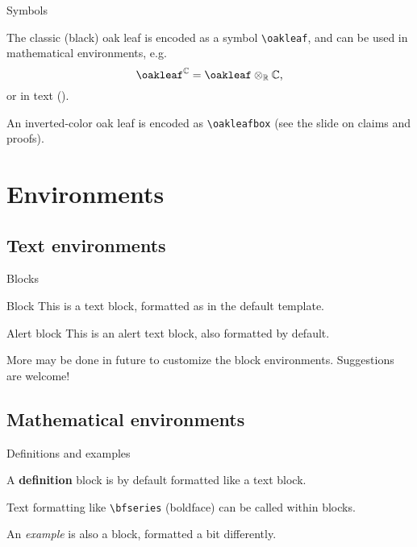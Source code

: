 \documentclass{beamer}
\begin{document}
\begin{frame}[fragile]{Symbols}

The classic (black) oak leaf is encoded as a symbol \verb|\oakleaf|, and can be used in mathematical environments, e.g.
\[\oakleaf^{\mathbb{C}}=\oakleaf\otimes_{\mathbb{R}}\mathbb{C}\text,\]
or in text (\oakleaf).

An inverted-color oak leaf is encoded as \verb|\oakleafbox| (see the slide on claims and proofs).

\end{frame}


\section{Environments}


\subsection{Text environments}


\begin{frame}{Blocks}

\begin{block}{Block}
This is a text block, formatted as in the default template.
\end{block}

\begin{alertblock}{Alert block}
This is an alert text block, also formatted by default.
\end{alertblock}

More may be done in future to customize the block environments. Suggestions are welcome!

\end{frame}


\subsection{Mathematical environments}


\begin{frame}[fragile]{Definitions and examples}

\begin{definition}
A {\bfseries definition} block is by default formatted like a text block.
\end{definition}

Text formatting like \verb|\bfseries| (boldface) can be called within blocks.

\begin{example}
An \emph{example} is also a block, formatted a bit differently.
\end{example}

\end{frame}
\end{document}
